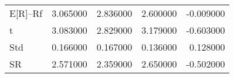 \begin{tabular}{lrrrr}
\toprule
\midrule
E[R]--Rf & 3.065000 & 2.836000 & 2.600000 & -0.009000 \\
t & 3.083000 & 2.829000 & 3.179000 & -0.603000 \\
Std & 0.166000 & 0.167000 & 0.136000 & 0.128000 \\
SR & 2.571000 & 2.359000 & 2.650000 & -0.502000 \\
\bottomrule
\end{tabular}

